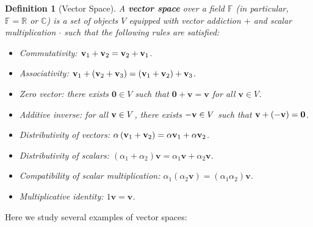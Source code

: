 \documentclass[11pt]{article}
\newtheorem{definition}[theorem]{Definition}
\begin{document}
\begin{definition}[Vector Space] A {\bf vector space} over a field \(\mathbb{F}\) (in particular, \(\mathbb{F} = \mathbb{R}\) or \(\mathbb{C}\)) is a set of objects \(V\) equipped with vector addiction $+$ and scalar multiplication $\cdot$ such that the following rules are satisfied:
\begin{itemize}
    \item Commutativity: \({\bf v}_1 + {\bf v}_2 = {\bf v}_2 + {\bf v}_1\).

    \item Associativity: \({\bf v}_1 + \left( {{\bf v}_2 + {\bf v}_{3}}\right)  = \left( {{\bf v}_1 + {\bf v}_2}\right)  + {\bf v}_{3}\).

    \item Zero vector: there exists \(\mathbf{0} \in  V\) such that \(\mathbf{0} + \mathbf{v} = \mathbf{v}\) for all \(\mathbf{v} \in  V\).

    \item Additive inverse: for all ${\bf v} \in V$, there exists \(-{\bf v} \in V\) such that ${\bf v} + (-{\bf v}) = {\bf 0}$.

    \item Distributivity of vectors: \(\alpha \left( {{\bf v}_1 + {\bf v}_2}\right)  = \alpha {\bf v}_1 + \alpha {\bf v}_2\).

    \item Distributivity of scalars: \(\left( {\alpha_1 + \alpha_2}\right) \mathbf{v} = \alpha_1\mathbf{v} + \alpha_2\mathbf{v}\).

    \item Compatibility of scalar multiplication: \(\alpha_1\left( {\alpha_2\mathbf{v}}\right)  = \left( {\alpha_1\alpha_2}\right) \mathbf{v}\).

    \item Multiplicative identity: \(1\mathbf{v} = \mathbf{v}\).
\end{itemize}
\end{definition}

Here we study several examples of vector spaces:
\end{document}
